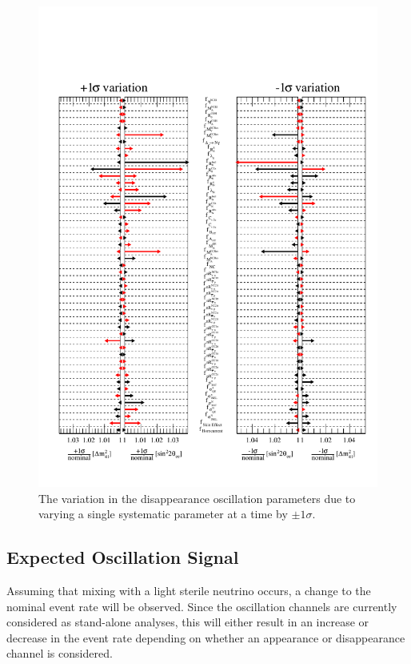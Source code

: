 \begin{figure}[h!]
    \centering
    \includegraphics[width = \textwidth]{figures-chap6/star_plot/nue_dsisapp_pulls_2.pdf}
    \caption[\nue disappearance oscillation parameter pulls due to varying a single systematic parameter by $\pm1\sigma$.]{The variation in the \nue disappearance oscillation parameters due to varying a single systematic parameter at a time by $\pm1\sigma$.}
    \label{fig:nue_disapp_osc_param_pulls}
\end{figure}


\clearpage


\subsection{Expected Oscillation Signal}

Assuming that mixing with a light sterile neutrino occurs, a change to the nominal event rate will be observed. Since the oscillation channels are currently considered as stand-alone analyses, this will either result in an increase or decrease in the event rate depending on whether an appearance or disappearance channel is considered. 


